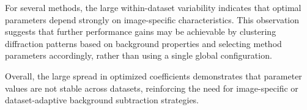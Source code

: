 \documentclass[iucr]{iucrjournals}
\begin{document}
For several methods, the large within-dataset variability indicates that optimal parameters depend strongly on image-specific characteristics. This observation suggests that further performance gains may be achievable by clustering diffraction patterns based on background properties and selecting method parameters accordingly, rather than using a single global configuration.

Overall, the large spread in optimized coefficients demonstrates that parameter values are not stable across datasets, reinforcing the need for image-specific or dataset-adaptive background subtraction strategies.

\end{document}
